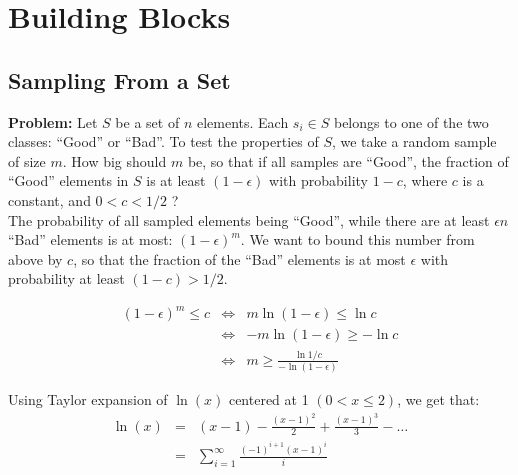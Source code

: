 \documentclass{article}
\begin{document}
 




\section{Building Blocks}

\subsection{Sampling From a Set} \label{sec:sampling}
{\bf Problem:} Let $S$ be a set of $n$ elements. Each $s_i \in S$ belongs to
one of the two classes: ``Good'' or ``Bad''. To test the properties
of $S$, we take a random sample of size $m$. How big should $m$ be, so
that if all samples are ``Good'', the fraction of 
``Good''  elements in $S$ is at least $(1-\epsilon)$ with
probability $1-c$, where $c$ is a constant, and $0<c<1/2$ ?\\

 The probability of all sampled elements being ``Good'', while
there are at least $\epsilon n$ ``Bad'' elements is at most:
$(1-\epsilon)^{m}$. We want to bound this number from above by $c$, so
that the fraction of the ``Bad'' elements is at most 
$\epsilon$ with probability at least $(1-c) > 1/2$.

\begin{eqnarray*}
(1-\epsilon)^{m} \leq c &\Leftrightarrow& m\ln{(1-\epsilon)} \leq \ln{c}\\
&\Leftrightarrow& -m\ln{(1-\epsilon)} \geq -\ln{c}\\
&\Leftrightarrow& m \geq \frac{\ln{1/c}}{-\ln{(1-\epsilon)}}  
\end{eqnarray*}

Using Taylor expansion of $\ln{(x)}$ centered at 1 $( 0 < x \leq 2)$, we get that:
\begin{eqnarray*}
\ln{(x)} &=& (x-1) - \frac{(x-1)^2}{2} + \frac{(x-1)^{3}}{3} - \ldots \\
&=& \sum_{i=1}^{\infty} \frac{(-1)^{i+1}(x-1)^{i}}{i}
\end{eqnarray*}
\end{document}

